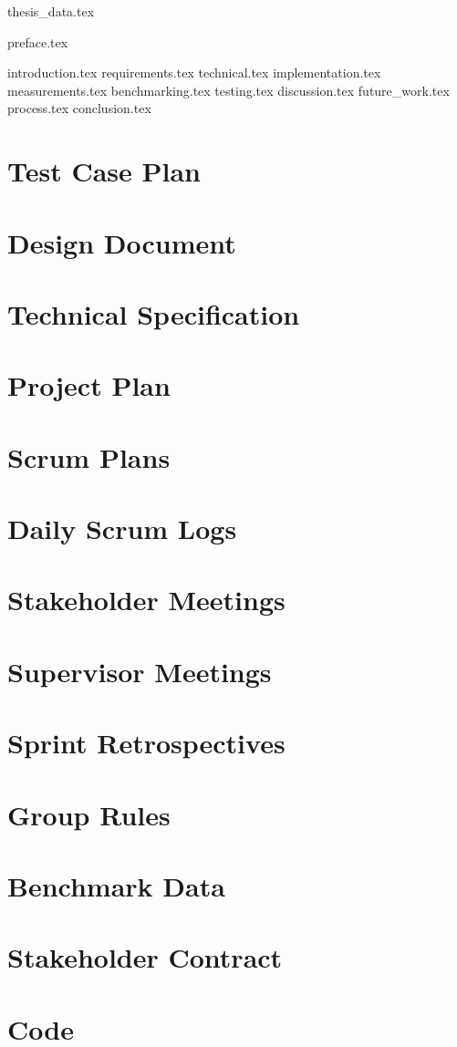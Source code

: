 \documentclass[BSP,english,oneside]{ntnuthesis/ntnubachelorthesis}
\begin{document}
{thesis_data.tex}

\makefrontpages

{preface.tex}

\tableofcontents
\listoffigures
\listoftables

{introduction.tex}
{requirements.tex}
{technical.tex}
{implementation.tex}
{measurements.tex}
{benchmarking.tex}
{testing.tex}
{discussion.tex}
{future_work.tex}
{process.tex}
{conclusion.tex}




\appendix %
\chapter{Test Case Plan}
\chapter{Design Document}
\chapter{Technical Specification}
\chapter{Project Plan}
\chapter{Scrum Plans}
\chapter{Daily Scrum Logs}
\chapter{Stakeholder Meetings}
\chapter{Supervisor Meetings}
\chapter{Sprint Retrospectives}
\chapter{Group Rules}
\chapter{Benchmark Data}
\chapter{Stakeholder Contract}
\chapter{Code}
\end{document}
